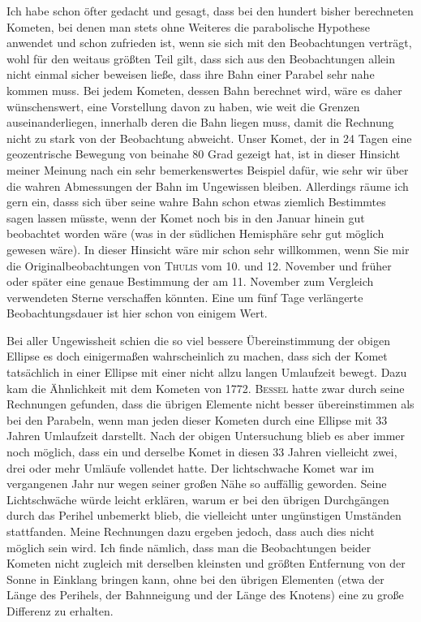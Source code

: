 \par\indent Ich habe schon öfter gedacht und gesagt, dass bei den hundert bisher berechneten Kometen, bei denen man stets ohne Weiteres die parabolische Hypothese anwendet und schon zufrieden ist, wenn sie sich mit den Beobachtungen verträgt, wohl für den weitaus größten Teil gilt, dass sich aus den Beobachtungen allein nicht einmal sicher beweisen ließe, dass ihre Bahn einer Parabel sehr nahe kommen muss. Bei jedem Kometen, dessen Bahn berechnet wird, wäre es daher wünschenswert, eine Vorstellung davon zu haben, wie weit die Grenzen auseinanderliegen, innerhalb deren die Bahn liegen muss, damit die Rechnung nicht zu stark von der Beobachtung abweicht. Unser Komet, der in 24 Tagen eine geozentrische Bewegung von beinahe 80 Grad gezeigt hat, ist in dieser Hinsicht meiner Meinung nach ein sehr bemerkenswertes Beispiel dafür, wie sehr wir über die wahren Abmessungen der Bahn im Ungewissen bleiben. Allerdings räume ich gern ein, dasss sich über seine wahre Bahn schon etwas ziemlich Bestimmtes sagen lassen müsste, wenn der Komet noch bis in den Januar hinein gut beobachtet worden wäre (was in der südlichen Hemisphäre sehr gut möglich gewesen wäre). In dieser Hinsicht wäre mir schon sehr willkommen, wenn Sie mir die Originalbeobachtungen von \textsc{Thulis} vom 10. und 12. November und früher oder später eine genaue Bestimmung der am 11. November zum Vergleich verwendeten Sterne verschaffen könnten. Eine um fünf Tage verlängerte Beobachtungsdauer ist hier schon von einigem Wert.

\par\indent Bei aller Ungewissheit schien die so viel bessere Übereinstimmung der obigen Ellipse es doch einigermaßen wahrscheinlich zu machen, dass sich der Komet tatsächlich in einer Ellipse mit einer nicht allzu langen Umlaufzeit bewegt. Dazu kam die Ähnlichkeit mit dem Kometen von 1772. \textsc{Bessel} hatte zwar durch seine Rechnungen gefunden, dass die übrigen Elemente nicht besser übereinstimmen als bei den Parabeln, wenn man jeden dieser Kometen durch eine Ellipse mit 33 Jahren Umlaufzeit darstellt. Nach der obigen Untersuchung blieb es aber immer noch möglich, dass ein und derselbe Komet in diesen 33 Jahren vielleicht zwei, drei
%
oder mehr Umläufe vollendet hatte. Der lichtschwache Komet war im vergangenen Jahr nur wegen seiner großen Nähe so auffällig geworden. Seine Lichtschwäche würde leicht erklären, warum er bei den übrigen Durchgängen durch das Perihel unbemerkt blieb, die vielleicht unter ungünstigen Umständen stattfanden. Meine Rechnungen dazu ergeben jedoch, dass auch dies nicht möglich sein wird. Ich finde nämlich, dass man die Beobachtungen beider Kometen nicht zugleich mit derselben kleinsten und größten Entfernung von der Sonne in Einklang bringen kann, ohne bei den übrigen Elementen (etwa der Länge des Perihels, der Bahnneigung und der Länge des Knotens) eine zu große Differenz zu erhalten.

